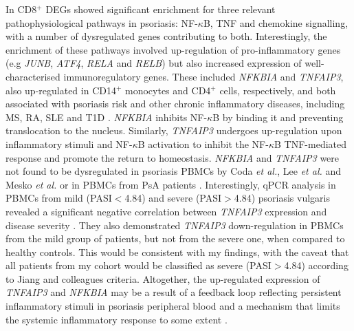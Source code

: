 In CD8$^+$ DEGs showed significant enrichment for three relevant pathophysiological pathways in psoriasis: NF-$\kappa$B, TNF and chemokine signalling, with a number of dysregulated genes contributing to both. Interestingly, the enrichment of these pathways involved up-regulation of pro-inflammatory genes (e.g \textit{JUNB}, \textit{ATF4}, \textit{RELA} and \textit{RELB}) but also increased expression of well-characterised immunoregulatory genes. These included \textit{NFKBIA} and \textit{TNFAIP3}, also up-regulated in CD14$^+$ monocytes and CD4$^+$ cells, respectively, and both associated with psoriasis risk and other chronic inflammatory diseases, including MS, RA, SLE and T1D \parencite{Vereecke2011}. \textit{NFKBIA} inhibits NF-$\kappa$B by binding it and preventing translocation to the nucleus. Similarly, \textit{TNFAIP3} undergoes up-regulation upon inflammatory stimuli and NF-$\kappa$B activation to inhibit the NF-$\kappa$B TNF-mediated response and promote the return to homeostasis. \textit{NFKBIA} and \textit{TNFAIP3} were not found to be dysregulated in psoriasis PBMCs by Coda \textit{et al.}, Lee \textit{et al.} and Mesko \textit{et al.} or in PBMCs from PsA patients  \parencite{Dolcino2015}. Interestingly, qPCR analysis in PBMCs from mild (PASI$<$4.84) and severe (PASI$>$4.84) psoriasis vulgaris revealed a significant negative correlation between \textit{TNFAIP3} expression and disease severity \parencite{Jiang2012}. They also demonstrated \textit{TNFAIP3} down-regulation in PBMCs from the mild group of patients, but not from the severe one, when compared to healthy controls. This would be consistent with my findings, with the caveat that all patients from my cohort would be classified as severe (PASI$>$4.84) according to Jiang and colleagues criteria. Altogether, the up-regulated expression of \textit{TNFAIP3} and \textit{NFKBIA} may be a result of a feedback loop reflecting persistent inflammatory stimuli in psoriasis peripheral blood and a mechanism that limits the systemic inflammatory response to some extent \parencite{Idel2003}. 

